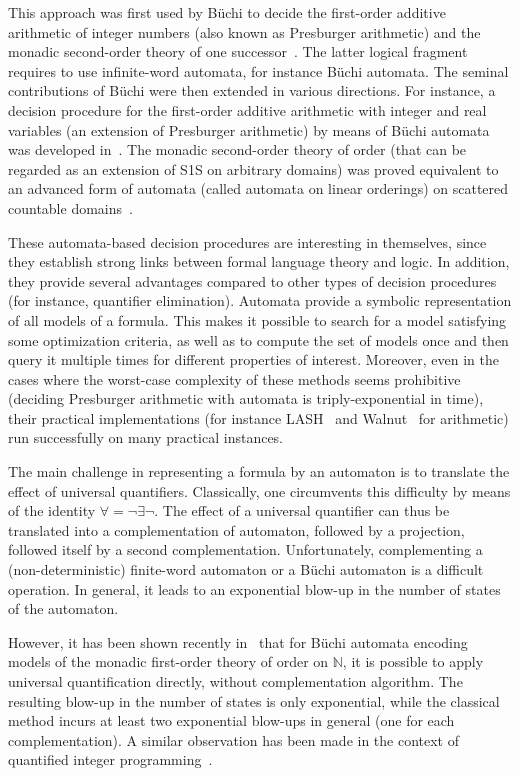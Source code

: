 \documentclass[]{article}
\begin{document}
This approach was first used by Büchi to decide the first-order additive arithmetic of integer numbers (also known as Presburger arithmetic)\cite{buc60} and the monadic second-order theory of one successor~\cite{buc62}. The latter logical fragment requires to use infinite-word automata, for instance Büchi automata. The seminal contributions of Büchi were then extended in various directions. For instance, a decision procedure for the first-order additive arithmetic with integer and real variables (an extension of Presburger arithmetic) by means of Büchi automata was developed in~\cite{}. The monadic second-order theory of order (that can be regarded as an extension of S1S on arbitrary domains) was proved equivalent to an advanced form of automata (called automata on linear orderings) on scattered countable domains~\cite{}.

These automata-based decision procedures are interesting in themselves, since they establish strong links between formal language theory and logic. In addition, they provide several advantages compared to other types of decision procedures (for instance, quantifier elimination). Automata provide a symbolic representation of all models of a formula. This makes it possible to search for a model satisfying some optimization criteria, as well as to compute the set of models once and then query it multiple times for different properties of interest. Moreover, even in the cases where the worst-case complexity of these methods seems prohibitive (deciding Presburger arithmetic with automata is triply-exponential in time), their practical implementations (for instance LASH~\cite{} and Walnut~\cite{} for arithmetic) run successfully on many practical instances.

The main challenge in representing a formula by an automaton is to translate the effect of universal quantifiers. Classically, one circumvents this difficulty by means of the identity $\forall=\neg\exists\neg$. The effect of a universal quantifier can thus be translated into a complementation of automaton, followed by a projection, followed itself by a second complementation. Unfortunately, complementing a (non-deterministic) finite-word automaton or a Büchi automaton is a difficult operation. In general, it leads to an exponential blow-up in the number of states of the automaton. 

However, it has been shown recently in~\cite{} that for Büchi automata encoding models of the monadic first-order theory of order on $\mathbb{N}$, it is possible to apply universal quantification directly, without complementation algorithm. The resulting blow-up in the number of states is only exponential, while the classical method incurs at least two exponential blow-ups in general (one for each complementation). A similar observation has been made in the context of quantified integer programming~\cite{}.
\end{document}
